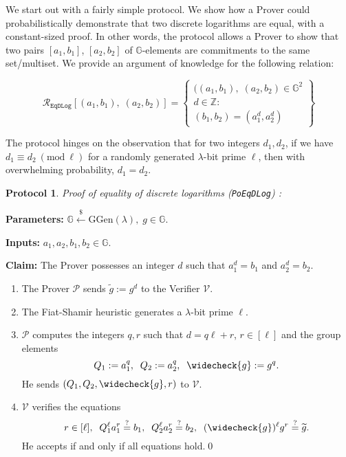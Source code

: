 \documentclass[11pt, lettersize, notitlepage, leqno, footskip=0.6cm]{article}
\newcommand{\ttt}{\texttt}
\newcommand{\bG}{\mathbb{G}}
\newcommand{\wti}{\widetilde}
\newcommand{\mc}{\mathcal}
\newcommand{\mb}{\mathbb}
\newcommand{\mr}{\mathrm}
\newcommand{\lam}{\lambda}
\newcommand{\lamb}{\lambda}
\newcommand{\weck}{\widecheck}
\newcommand{\vs}{\vspace{-0.15cm}}
\newcommand{\noin}{\noindent}
\newcommand{\op}{overwhelming probability}
\newcommand{\sta}{\stackrel{?}{=}}
\newcommand{\Mod}[1]{\ (\mathrm{mod}\ #1)}
\newtheorem{Prot}[Thm]{Protocol}
\numberwithin{equation}{section}
\begin{document}
We start out with a fairly simple protocol. We show how a Prover could probabilistically demonstrate that two discrete logarithms are equal, with a constant-sized proof. In other words, the protocol allows a Prover to show that two pairs $[a_1, b_1]$, $[a_2, b_2]$ of $\bG$-elements are commitments to the same set/multiset. We provide an argument of knowledge for  the following relation:

\[
  \mc{R}_{\ttt{EqDLog}}[(a_1, b_1),\;(a_2,b_2)] = \left\{\begin{array}{l}
    ((a_1, b_1),\; (a_2,b_2)\in\mb{G}^2\\
    d\in\mb{Z}: \\
    (b_1,b_2) = (a_1^d,a_2^d)
  \end{array}\right\}
\]

\noin The protocol hinges on the observation that for two integers $d_1,d_2$, if we have $d_1\equiv d_2\Mod{\ell}$ for a randomly generated $\lam$-bit prime $\ell$, then with \op, $d_1= d_2$.

\vspace{0.15cm}


\begin{Prot}\label{EqDLog} \normalfont \textit{Proof of equality of discrete logarithms} (\verb|PoEqDLog|) :\end{Prot} \vspace{-0.3cm}

\noindent \textbf{Parameters:} $\mb{G}\xleftarrow{\$} \mr{GGen}(\lamb), \; g\in \mb{G}$.

\noindent \textbf{Inputs:} $a_1, a_2, b_1, b_2 \in \mb{G}$.

\noindent \textbf{Claim:} The Prover possesses an integer $d$ such that $a_1^d = b_1$ and $a_2^d = b_2$.

\begin{enumerate}[wide, labelwidth=!, labelindent=0pt]\vs \item The Prover $\mc{P}$ sends $\wti{g} := g^d$ to the Verifier $\mc{V}$. \vs

\item The Fiat-Shamir heuristic generates a $\lamb$-bit prime $\ell$. \vs

\item $\mc{P}$ computes the integers $q, r$ such that $d = q\ell+r$, $r\in [\ell]$ and the group elements \vs $$Q_1:= a_1^q,\;\; Q_2:= a_2^q,\;\; \weck{g}:= g^q.$$ He sends $(Q_1, Q_2, \weck{g}, r)$ to $\mc{V}$. \vs

\item $\mc{V}$ verifies the equations \vs $$r\in [\ell],\;\;Q_1^{\ell}a_1^r \sta  b_1, \;\; Q_2^{\ell}a_2^r \sta  b_2, \;\; (\weck{g})^{\ell}g^r \sta \wti{g}.$$ He accepts if and only if all equations hold.\qed \end{enumerate}
\end{document}
